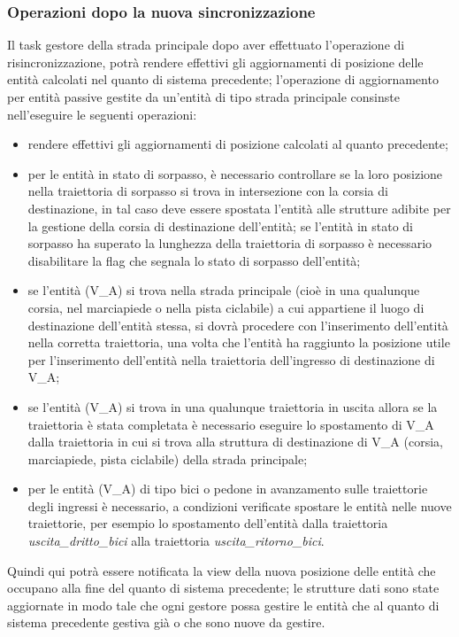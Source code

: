 \subsubsection*{Operazioni dopo la nuova sincronizzazione} 
Il task gestore della strada principale dopo aver effettuato l'operazione di risincronizzazione, potrà rendere effettivi gli aggiornamenti di posizione delle entità calcolati nel quanto di sistema precedente; l'operazione di aggiornamento per entità passive gestite da un'entità di tipo strada principale consinste nell'eseguire le seguenti operazioni:
\begin{itemize}
\item rendere effettivi gli aggiornamenti di posizione calcolati al quanto precedente;
\item per le entità in stato di sorpasso, è necessario controllare se la loro posizione nella traiettoria di sorpasso si trova in intersezione con la corsia di destinazione, in tal caso deve essere spostata l'entità alle strutture adibite per la gestione della corsia di destinazione dell'entità; se l'entità in stato di sorpasso ha superato la lunghezza della traiettoria di sorpasso è necessario disabilitare la flag che segnala lo stato di sorpasso dell'entità;
\item se l'entità (V\_A) si trova nella strada principale (cioè in una qualunque corsia, nel marciapiede o nella pista ciclabile) a cui appartiene il luogo di destinazione dell'entità stessa, si dovrà procedere con l'inserimento dell'entità nella corretta traiettoria, una volta che l'entità ha raggiunto la posizione utile per l'inserimento dell'entità nella traiettoria dell'ingresso di destinazione di V\_A;
\item se l'entità (V\_A) si trova in una qualunque traiettoria in uscita allora se la traiettoria è stata completata è necessario eseguire lo spostamento di V\_A dalla traiettoria in cui si trova alla struttura di destinazione di V\_A (corsia, marciapiede, pista ciclabile) della strada principale;
\item per le entità (V\_A) di tipo bici o pedone in avanzamento sulle traiettorie degli ingressi è necessario, a condizioni verificate spostare le entità nelle nuove traiettorie, per esempio lo spostamento dell'entità dalla traiettoria \textit{usci\-ta\_drit\-to\_bi\-ci} alla traiettoria \textit{usci\-ta\_ri\-tor\-no\_bi\-ci}.  
\end{itemize}
Quindi qui potrà essere notificata la view della nuova posizione delle entità che occupano alla fine del quanto di sistema precedente; le strutture dati sono state aggiornate in modo tale che ogni gestore possa gestire le entità che al quanto di sistema precedente gestiva già o che sono nuove da gestire.  


